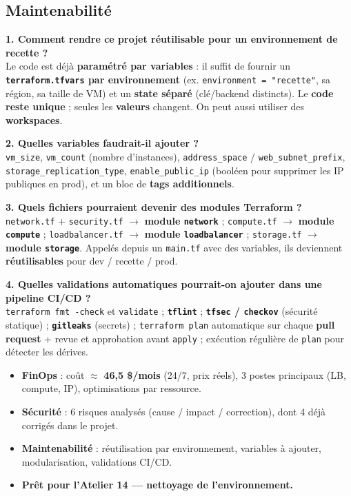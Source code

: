 \documentclass[11pt,a4paper]{article}
\newcommand{\arr}{\ensuremath{\rightarrow}}
\newcommand{\code}[1]{\texttt{#1}}
\begin{document}
\subsection{Maintenabilité}
\textbf{1. Comment rendre ce projet réutilisable pour un environnement de recette ?}\\
Le code est déjà \textbf{paramétré par variables} : il suffit de fournir un \textbf{\code{terraform.tfvars} par
environnement} (ex. \code{environment = "recette"}, sa région, sa taille de VM) et un \textbf{state séparé}
(clé/backend distincts). Le \textbf{code reste unique} ; seules les \textbf{valeurs} changent. On peut aussi
utiliser des \textbf{workspaces}.

\textbf{2. Quelles variables faudrait-il ajouter ?}\\
\code{vm\_size}, \code{vm\_count} (nombre d'instances), \code{address\_space} / \code{web\_subnet\_prefix},
\code{storage\_replication\_type}, \code{enable\_public\_ip} (booléen pour supprimer les IP publiques en prod),
et un bloc de \textbf{tags additionnels}.

\textbf{3. Quels fichiers pourraient devenir des modules Terraform ?}\\
\code{network.tf} + \code{security.tf} \arr{} \textbf{module \code{network}} ; \code{compute.tf} \arr{}
\textbf{module \code{compute}} ; \code{loadbalancer.tf} \arr{} \textbf{module \code{loadbalancer}} ;
\code{storage.tf} \arr{} \textbf{module \code{storage}}. Appelés depuis un \code{main.tf} avec des variables,
ils deviennent \textbf{réutilisables} pour dev / recette / prod.

\textbf{4. Quelles validations automatiques pourrait-on ajouter dans une pipeline CI/CD ?}\\
\code{terraform fmt -check} et \code{validate} ; \textbf{\code{tflint}} ; \textbf{\code{tfsec} / \code{checkov}}
(sécurité statique) ; \textbf{\code{gitleaks}} (secrets) ; \code{terraform plan} automatique sur chaque
\textbf{pull request} + revue et approbation avant \code{apply} ; exécution régulière de \code{plan} pour
détecter les dérives.

\begin{etatbox}
\begin{itemize}
  \item \textbf{FinOps} : coût $\approx$ \textbf{46,5 \$/mois} (24/7, prix réels), 3 postes principaux (LB, compute, IP), optimisations par ressource.
  \item \textbf{Sécurité} : 6 risques analysés (cause / impact / correction), dont 4 déjà corrigés dans le projet.
  \item \textbf{Maintenabilité} : réutilisation par environnement, variables à ajouter, modularisation, validations CI/CD.
  \item \textbf{Prêt pour l'Atelier 14 — nettoyage de l'environnement.}
\end{itemize}
\end{etatbox}
\end{document}
